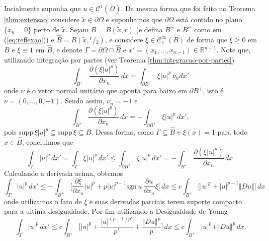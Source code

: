 \documentclass[a4paper, 11pt]{book}
\theoremstyle{definition}
\newcommand{\bR}{\mathbb{R}}
\newcommand{\cC}{\mathcal{C}}
\newcommand{\supp}{\mathrm{supp}\,}
\newcommand{\sgn}{\mathrm{sgn}}
\newcommand{\sfrac}[2]{{}^{#1}\!\!/\!_{#2}}
\begin{document}
\begin{prf}
    Incialmente suponha que $u \in \cC^1(\overline{\Omega})$. Da mesma forma que foi feito no Teorema \ref{thm:extensao} considere $\tilde x \in \partial\Omega$ e suponhamos que $\partial\Omega$ está contido no plano $\{x_n = 0\}$ perto de $\tilde x$.
    Sejam $B = B(\tilde x, r)$ (e defina $B^+$ e $B^-$ como em (\ref{eq:reflexao})) e $\widehat B = B(\tilde x, \sfrac{r}{2})$,
    e considere $\xi \in \cC^{\infty}_c(B)$ de forma que $\xi \geqslant 0$ em $B$ e $\xi \equiv 1$ em $\widehat B$, e denote $\Gamma = \partial \Omega \cap \widehat B$ e $x' = (x_1,\dots,x_{n-1}) \in \bR^{n-1}$.
    Note que, utilizando integração por partes (ver Teorema \ref{thm:integracao-por-partes})
    \[
        \int_{B^+} \dfrac{\partial (\xi |u|^p)}{\partial x_n}\,dx = \int_{\partial B^+} \xi |u|^p \, \nu_n dx'
    \]
    onde $\nu$ é o vetor normal unitário que aponta para baixo em $\partial B^+$, isto é $\nu =  (0,\dots,0,-1)$. Sendo assim, $\nu_n = -1$ e 
    \[
        \int_{B^+} \dfrac{\partial (\xi |u|^p)}{\partial x_n} \,dx = -\int_{\partial B^+} \xi |u|^p \,dx',
    \]
    pois $\supp \xi |u|^p \subseteq \supp \xi  \subseteq B$.
    Dessa forma, como $\Gamma \subseteq \hat B$ e $\xi(x) = 1$ para todo $x \in \hat B$, concluimos que
    \[
        \int_{\Gamma} |u|^p \,dx' = \int_{\Gamma} \xi|u|^p \,dx' \leqslant \int_{\partial B^+} \xi|u|^p \,dx' = -\int_{B^+} \dfrac{\partial (\xi |u|^p)}{\partial x_n} \,dx.
    \]
    Calculando a derivada acima, obtemos
    \[
        \int_\Gamma |u|^p \,dx' \leqslant - \int_{B^+} \Big[ \dfrac{\partial \xi}{\partial x_n} |u|^p + p|u|^{p-1} \sgn\,u\,\dfrac{\partial u}{\partial x_n} \xi \Big] \,dx \leqslant c \int_{B^+} \Big[ |u|^p + |u|^{p-1} \Vert Du \Vert \Big] \,dx
    \]
    onde utilizamos o fato de $\xi$ e suas derivadas parciais terem suporte compacto para a ultima desigualdade. Por fim utilizando a Desigualdade de Young
    \begin{equation} \label{eq:umaisdu}
        \int_\Gamma |u|^p \,dx' \leqslant c \int_{B^+} \bigg[ |u|^p + \frac{|u|^{(p-1)p'}}{p'} + \frac{\Vert Du \Vert^p}{p} \bigg] \,dx \leqslant c \int_{B^+} |u|^p + \Vert Du \Vert^p \,dx.
    \end{equation}


\end{prf}
\end{document}
